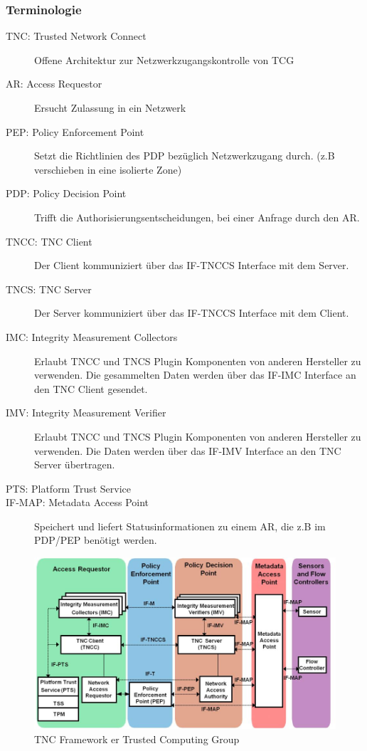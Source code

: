 \subsubsection{Terminologie}
\begin{description}
	\item[TNC: Trusted Network Connect] Offene Architektur zur Netzwerkzugangskontrolle von TCG
	\item[AR: Access Requestor] Ersucht Zulassung in ein Netzwerk
	\item[PEP: Policy Enforcement Point] Setzt die Richtlinien des PDP bezüglich Netzwerkzugang durch. (z.B verschieben in eine isolierte Zone)
	\item[PDP: Policy Decision Point] Trifft die Authorisierungsentscheidungen, bei einer Anfrage durch den AR.
	\item[TNCC: TNC Client] Der Client kommuniziert über das IF-TNCCS Interface mit dem Server.
	\item[TNCS: TNC Server] Der Server kommuniziert über das IF-TNCCS Interface mit dem Client.
	\item[IMC: Integrity Measurement Collectors] Erlaubt TNCC und TNCS Plugin Komponenten von anderen Hersteller zu verwenden. Die gesammelten Daten werden über das IF-IMC Interface an den TNC Client gesendet. 
	\item[IMV: Integrity Measurement Verifier] Erlaubt TNCC und TNCS Plugin Komponenten von anderen Hersteller zu verwenden. Die Daten werden über das IF-IMV Interface an den TNC Server übertragen.
	\item[PTS: Platform Trust Service]
	\item[IF-MAP: Metadata Access Point] Speichert und liefert Statusinformationen zu einem AR, die z.B im PDP/PEP benötigt werden.
\end{description}
\begin{figure}[h]
\centering
\includegraphics[width=\linewidth]{images/tnc_framework}
\caption{TNC Framework er Trusted Computing Group}
\label{fig:tncframework}
\end{figure}

